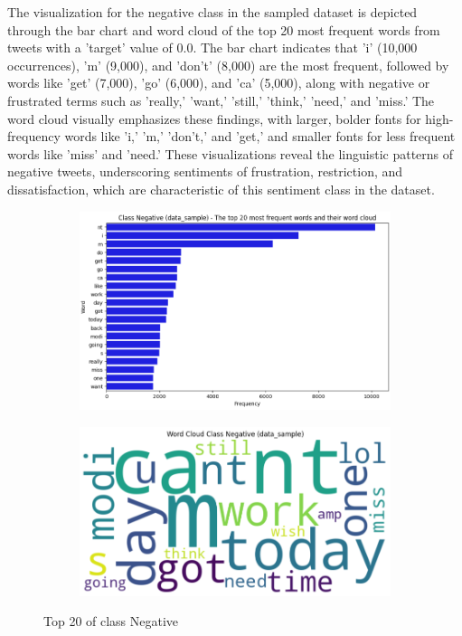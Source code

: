 The visualization for the negative class in the sampled dataset is depicted through the bar chart and word cloud of the top 20 most frequent words from tweets with a 'target' value of 0.0. The bar chart indicates that 'i' (10,000 occurrences), 'm' (9,000), and 'don’t' (8,000) are the most frequent, followed by words like 'get' (7,000), 'go' (6,000), and 'ca' (5,000), along with negative or frustrated terms such as 'really,' 'want,' 'still,' 'think,' 'need,' and 'miss.' The word cloud visually emphasizes these findings, with larger, bolder fonts for high-frequency words like 'i,' 'm,' 'don’t,' and 'get,' and smaller fonts for less frequent words like 'miss' and 'need.' These visualizations reveal the linguistic patterns of negative tweets, underscoring sentiments of frustration, restriction, and dissatisfaction, which are characteristic of this sentiment class in the dataset.

\begin{figure}[H]
    \centering
    \begin{subfigure}[b]{0.48\textwidth}
        \includegraphics[width=\textwidth]{img/visualize_pic/top20_nega.png}
    \end{subfigure}
    \begin{subfigure}[b]{0.48\textwidth}
        \includegraphics[width=\textwidth]{img/visualize_pic/nega_wordcloud.png}
    \end{subfigure}
    \caption{Top 20 of class Negative}
\end{figure}

